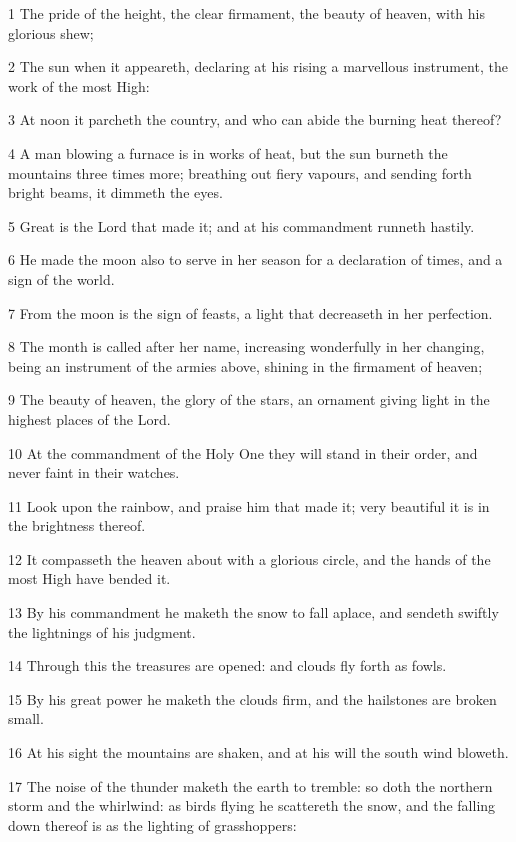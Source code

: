 \par 1 The pride of the height, the clear firmament, the beauty of heaven, with his glorious shew;
\par 2 The sun when it appeareth, declaring at his rising a marvellous instrument, the work of the most High:
\par 3 At noon it parcheth the country, and who can abide the burning heat thereof?
\par 4 A man blowing a furnace is in works of heat, but the sun burneth the mountains three times more; breathing out fiery vapours, and sending forth bright beams, it dimmeth the eyes.
\par 5 Great is the Lord that made it; and at his commandment runneth hastily.
\par 6 He made the moon also to serve in her season for a declaration of times, and a sign of the world.
\par 7 From the moon is the sign of feasts, a light that decreaseth in her perfection.
\par 8 The month is called after her name, increasing wonderfully in her changing, being an instrument of the armies above, shining in the firmament of heaven;
\par 9 The beauty of heaven, the glory of the stars, an ornament giving light in the highest places of the Lord.
\par 10 At the commandment of the Holy One they will stand in their order, and never faint in their watches.
\par 11 Look upon the rainbow, and praise him that made it; very beautiful it is in the brightness thereof.
\par 12 It compasseth the heaven about with a glorious circle, and the hands of the most High have bended it.
\par 13 By his commandment he maketh the snow to fall aplace, and sendeth swiftly the lightnings of his judgment.
\par 14 Through this the treasures are opened: and clouds fly forth as fowls.
\par 15 By his great power he maketh the clouds firm, and the hailstones are broken small.
\par 16 At his sight the mountains are shaken, and at his will the south wind bloweth.
\par 17 The noise of the thunder maketh the earth to tremble: so doth the northern storm and the whirlwind: as birds flying he scattereth the snow, and the falling down thereof is as the lighting of grasshoppers:
